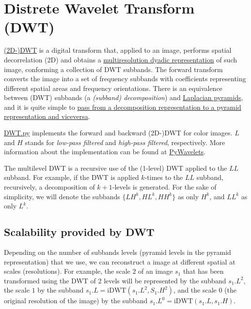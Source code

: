 \section{Distrete Wavelet Transform (DWT)}
\href{https://en.wikipedia.org/wiki/Discrete_wavelet_transform}{(2D-)DWT}
is a digital transform that, applied to an image, performs spatial
decorrelation (2D) and obtains a
\href{https://vicente-gonzalez-ruiz.github.io/image_transformations_for_coding/indexse24.html#x34-3400024}{multiresolution
  dyadic representation} of such image, conforming a collection of DWT
subbands. The forward transform converts the image into a set of
frequency subbands with coefficients representing different spatial
areas and frequency orientations. There is an equivalence between
(DWT) subbands (a \emph{(subband) decomposition}) and
\href{https://en.wikipedia.org/wiki/Pyramid_(image_processing)#Laplacian_pyramid}{Laplacian
  pyramids}, and it is quite simple to
\href{https://vicente-gonzalez-ruiz.github.io/pyramids-and-wavelets/}{pass
  from a decomposition representation to a pyramid representation and
  viceversa}.

\href{https://github.com/vicente-gonzalez-ruiz/MCDWT/blob/master/src/DWT.py}{DWT.py}
implements the forward and backward (2D-)DWT for color images. $L$ and
$H$ stands for \emph{low-pass filtered} and \emph{high-pass filtered},
respectively.  More information about the implementation can be found at
\href{https://pywavelets.readthedocs.io/en/latest/index.html}{PyWavelets}.



The multilevel DWT is a recursive use of the (1-level) DWT applied to
the $LL$ subband. For example, if the DWT is applied $k$-times to the
$LL$ subband, recursively, a decomposition of $k+1$-levels is generated. For
the sake of simplicity, we will denote the subbands $\{LH^k, HL^k,
HH^k\}$ as only $H^k$, and $LL^k$ as only $L^k$.

\subsection{Scalability provided by DWT}
Depending on the number of subbands levels (pyramid levels in the
pyramid representation) that we use, we can reconstruct a image at
different spatial at scales (resolutions). For example, the scale $2$
of an image $s_1$ that has been transformed using the DWT of 2 levels
will be represented by the subband $s_1.L^2$, the scale $1$ by the
subband $s_1.L=\text{iDWT}(s_1.L^2, S_1.H^2)$, and the scale $0$ (the
original resolution of the image) by the subband
$s_1.L^0=\text{iDWT}(s_1.L, s_1.H)$.

